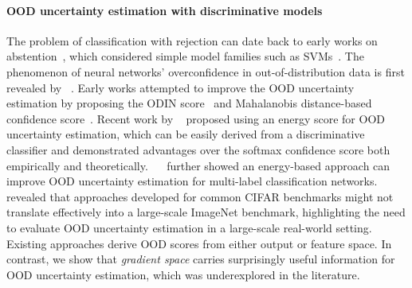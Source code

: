 \documentclass{article}
\begin{document}
\paragraph{OOD uncertainty estimation with discriminative models}  The problem of classification with rejection can date back to early works on abstention~\cite{chow1970optimum, fumera2002support}, which considered simple model families such as SVMs~\cite{cortes1995support}.
The phenomenon of neural networks' overconfidence in out-of-distribution data is first revealed by \citeauthor{nguyen2015deep}~\cite{nguyen2015deep}.
Early works attempted to improve the OOD uncertainty estimation by proposing the ODIN score~\citep{hsu2020generalized, liang2018enhancing} and Mahalanobis
distance-based confidence score~\citep{lee2018simple}.
Recent work by \citeauthor{liu2020energy}~\citep{liu2020energy} proposed using an energy score for OOD uncertainty estimation, which can be easily derived from a discriminative classifier and demonstrated advantages over the softmax confidence score both empirically and theoretically. ~\citeauthor{wang2021canmulti}~\cite{wang2021canmulti} further showed an energy-based approach  can improve OOD uncertainty estimation for multi-label classification networks. \citeauthor{huang2021mos}~\cite{huang2021mos} revealed that approaches developed for common CIFAR benchmarks might not translate effectively into a large-scale ImageNet benchmark, highlighting the need to evaluate OOD uncertainty estimation in a large-scale real-world setting.  %
Existing approaches derive OOD scores from either output or feature space. In contrast, we show that \emph{gradient space} carries surprisingly useful information for OOD uncertainty estimation, which was underexplored in the literature.

\end{document}
